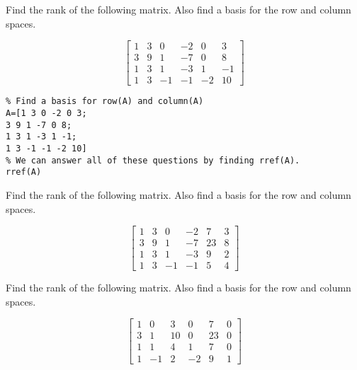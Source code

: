 \documentclass{ximera}
\begin{document}
\begin{problem}\label{prb:5.32} Find the rank of the following matrix. Also find a basis for the row
and column spaces.


$$\begin{bmatrix}
1 & 3 & 0 & -2 & 0 & 3 \\
3 & 9 & 1 & -7 & 0 & 8 \\
1 & 3 & 1 & -3 & 1 & -1 \\
1 & 3 & -1 & -1 & -2 & 10
\end{bmatrix}$$

\begin{hint}
    \begin{verbatim}
% Find a basis for row(A) and column(A)
A=[1 3 0 -2 0 3; 
3 9 1 -7 0 8;
1 3 1 -3 1 -1;
1 3 -1 -1 -2 10]
% We can answer all of these questions by finding rref(A).
rref(A)
\end{verbatim}
\end{hint}
\end{problem}

\begin{problem}\label{prb:5.33} Find the rank of the following matrix. Also find a basis for the row
and column spaces.

$$\begin{bmatrix}
1 & 3 & 0 & -2 & 7 & 3 \\
3 & 9 & 1 & -7 & 23 & 8 \\
1 & 3 & 1 & -3 & 9 & 2 \\
1 & 3 & -1 & -1 & 5 & 4
\end{bmatrix}$$
\end{problem}

\begin{problem}\label{prb:5.34} Find the rank of the following matrix. Also find a basis for the row
and column spaces.

$$\begin{bmatrix}
1 & 0 & 3 & 0 & 7 & 0 \\
3 & 1 & 10 & 0 & 23 & 0 \\
1 & 1 & 4 & 1 & 7 & 0 \\
1 & -1 & 2 & -2 & 9 & 1
\end{bmatrix}$$
\end{problem}

\end{document}

